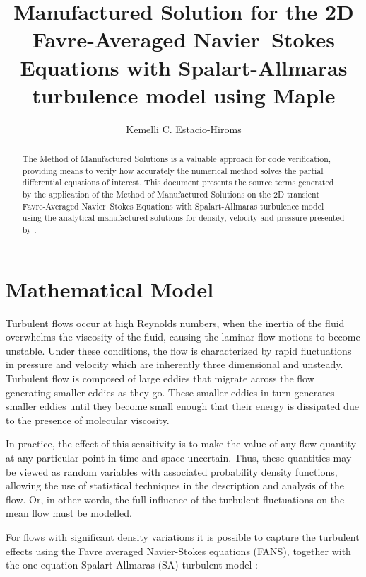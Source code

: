 \documentclass[10pt]{article}
\title{Manufactured Solution for the 2D Favre-Averaged Navier--Stokes Equations with Spalart-Allmaras turbulence model using Maple}
\author{Kemelli C. Estacio-Hiroms}
\begin{document}
\maketitle

\begin{abstract}
The Method of Manufactured Solutions is a valuable approach for code verification, providing means to verify how accurately the numerical method solves the partial differential equations of interest.
This document presents the source terms generated by the application of the Method of Manufactured Solutions on the 2D transient Favre-Averaged Navier--Stokes Equations with Spalart-Allmaras turbulence model using the analytical manufactured solutions for density, velocity and pressure presented by \citet{Roy2002}.
\end{abstract}





\section{Mathematical Model}

Turbulent flows occur at high Reynolds numbers, when the inertia of the fluid overwhelms the viscosity of the fluid, causing the laminar flow motions to become unstable. Under these conditions, the flow is characterized by rapid fluctuations in pressure and velocity which are inherently three dimensional and unsteady. Turbulent flow is composed of large eddies that migrate across the flow generating smaller eddies as they go. These smaller eddies in turn generates smaller eddies until they become small enough that their energy is dissipated due to the presence of molecular viscosity.

In practice, the effect of this sensitivity
is to make the value of any flow quantity at any particular point in
time and space uncertain.  Thus, these quantities may be viewed as
random variables with associated probability density functions,
allowing the use of statistical techniques in the description and
analysis of the flow. Or, in other words, the full influence of the turbulent fluctuations on the mean flow must be modelled.

For flows with significant density variations it is possible to  capture the turbulent effects using the Favre averaged Navier-Stokes equations (FANS), together with the one-equation Spalart-Allmaras (SA) turbulent model \citep{Oliver2010}:
\end{document}
